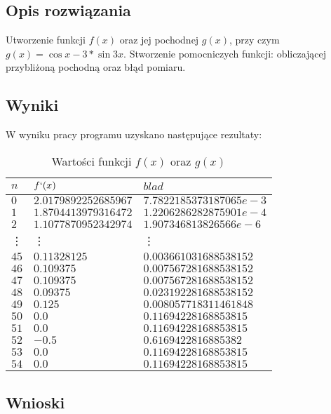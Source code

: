 \documentclass{classrep}
\begin{document}
	\subsection{Opis rozwiązania}
		Utworzenie funkcji $f(x)$ oraz jej pochodnej $g(x)$, przy czym $g(x)=\cos{x}-3*\sin{3x}$. Stworzenie 
		pomocniczych funkcji: obliczającej przybliżoną pochodną oraz błąd pomiaru.
	\subsection{Wyniki}
		W wyniku pracy programu uzyskano następujące rezultaty:
		
		\begin{table}[h!]
        	\centering
        	\footnotesize
			\begin{tabular}{lll} \toprule
				$n$ & $f`(x)$ & $blad$ \\ \midrule
				$0$ & $2.0179892252685967$ & $7.7822185373187065e-3$ \\ 
 				$1$ & $1.8704413979316472$ & $1.2206286282875901e-4$ \\
 				$2$ & $1.1077870952342974$ & $1.907346813826566e-6$ \\
 				\vdots & \vdots & \vdots \\
 				$45$ & $0.11328125$ & $0.003661031688538152$ \\
 				$46$ & $0.109375$ & $0.007567281688538152$ \\
 				$47$ & $0.109375$ & $0.007567281688538152$ \\
 				$48$ & $0.09375$ & $0.023192281688538152$ \\
 				$49$ & $0.125$ & $0.008057718311461848$ \\
 				$50$ & $0.0$ & $0.11694228168853815$ \\
 				$51$ & $0.0$ & $0.11694228168853815$ \\
 				$52$ & $-0.5$ & $0.6169422816885382$ \\
 				$53$ & $0.0$ & $0.11694228168853815$ \\
 				$54$ & $0.0$ & $0.11694228168853815$ \\\bottomrule
 			\end{tabular}
 			\caption{Wartości funkcji $f(x)$ oraz $g(x)$}
			\label{table:11}
		\end{table}		
		
	\subsection{Wnioski}
\end{document}
